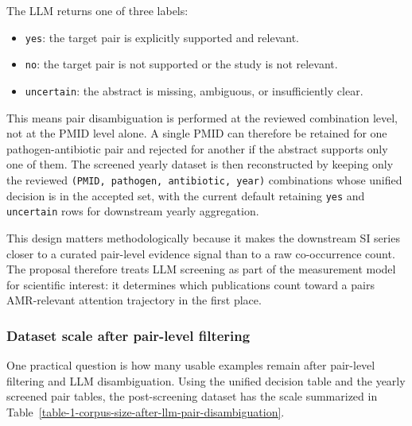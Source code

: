 \documentclass[
]{article}
\providecommand{\tightlist}{%
  \setlength{\itemsep}{0pt}\setlength{\parskip}{0pt}}
\begin{document}
The LLM returns one of three labels:

\begin{itemize}
\tightlist
\item
  \texttt{yes}: the target pair is explicitly supported and relevant.
\item
  \texttt{no}: the target pair is not supported or the study is not
  relevant.
\item
  \texttt{uncertain}: the abstract is missing, ambiguous, or
  insufficiently clear.
\end{itemize}

This means pair disambiguation is performed at the reviewed combination
level, not at the PMID level alone. A single PMID can therefore be
retained for one pathogen-antibiotic pair and rejected for another if
the abstract supports only one of them. The screened yearly dataset is
then reconstructed by keeping only the reviewed
\texttt{(PMID,\ pathogen,\ antibiotic,\ year)} combinations whose
unified decision is in the accepted set, with the current default
retaining \texttt{yes} and \texttt{uncertain} rows for downstream yearly
aggregation.

This design matters methodologically because it makes the downstream SI
series closer to a curated pair-level evidence signal than to a raw
co-occurrence count. The proposal therefore treats LLM screening as part
of the measurement model for scientific interest: it determines which
publications count toward a pair\textquotesingle s AMR-relevant
attention trajectory in the first place.

\subsubsection{Dataset scale after pair-level
filtering}\label{412-dataset-scale-after-pair-level-filtering}

One practical question is how many usable examples remain after
pair-level filtering and LLM disambiguation. Using the unified decision
table and the yearly screened pair tables, the post-screening dataset
has the scale summarized in
Table~\ref{table-1-corpus-size-after-llm-pair-disambiguation}.

\begin{table}[htbp]
\centering
\caption{Corpus size after LLM pair disambiguation}
\label{table-1-corpus-size-after-llm-pair-disambiguation}
\small
{}
\normalsize
\end{table}
\end{document}
